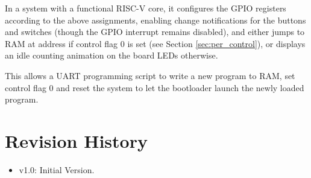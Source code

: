 In a system with a functional RISC-V core, it configures the GPIO registers according to the above assignments, enabling change notifications for the buttons and switches (though the GPIO interrupt remains disabled), and either jumps to RAM at address  if control flag 0 is set (see Section \ref{sec:per_control}), or displays an idle counting animation on the board LEDs otherwise.

This allows a UART programming script to write a new program to RAM, set control flag 0 and reset the system to let the bootloader launch the newly loaded program.

\newpage
\section{Revision History}\label{sec:revisions}
\begin{itemize}
    \item v1.0: Initial Version.
\end{itemize}
